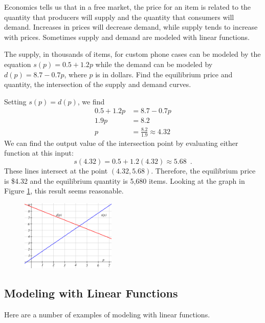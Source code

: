 Economics tells us that in a free market, the price for an item is related to the quantity that producers will supply and the quantity that consumers will demand. Increases in prices will decrease demand, while supply tends to increase with prices. Sometimes supply and demand are modeled with linear functions.
\begin{example}
  The supply, in thousands of items, for custom phone cases can be modeled by the equation $s(p)=0.5+1.2p$ while the demand can be modeled by $d(p)=8.7−0.7p$, where $p$ is in dollars. Find the equilibrium price and quantity, the intersection of the supply and demand curves.

  \begin{solution} Setting $s(p)=d(p)$, we find
  \begin{align*}
    0.5 + 1.2p &= 8.7−0.7p \\
    1.9p &= 8.2 \\
    p&=\frac{8.2}{1.9} \approx 4.32
  \end{align*}
  We can find the output value of the intersection point by evaluating either function at this input:
  $$ s(4.32) = 0.5+1.2(4.32) \approx 5.68 \enspace .$$
  These lines intersect at the point $(4.32, 5.68)$. Therefore, the equilibrium price is \$4.32 and the equilibrium quantity is 5,680 items. Looking at the graph in Figure \ref{fig:intersection}, this result seems reasonable.
  \begin{figure}[!ht]
  \centering
  \includegraphics[width=0.4\textwidth]{img/chap1/sec1-4/image053.png}
  \caption{}
  \label{fig:intersection}
  \end{figure}
\end{solution}\end{example}

\subsection{Modeling with Linear Functions}
\label{ssec:modeling-linear}

Here are a number of examples of modeling with linear functions.

